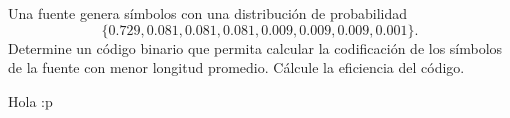 
Una fuente genera símbolos con una distribución de probabilidad 
$$\{0.729, 0.081, 0.081, 0.081, 0.009, 0.009, 0.009, 0.001\}.$$
Determine un código binario que permita calcular la codificación de los símbolos de la fuente con menor longitud promedio. Cálcule la eficiencia del código.
\begin{sol}
    Hola :p
\end{sol}